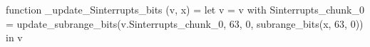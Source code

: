 function _update_Sinterrupts_bits (v, x) = let v = { v with Sinterrupts_chunk_0 = update_subrange_bits(v.Sinterrupts_chunk_0, 63, 0, subrange_bits(x, 63, 0)) } in
  v
